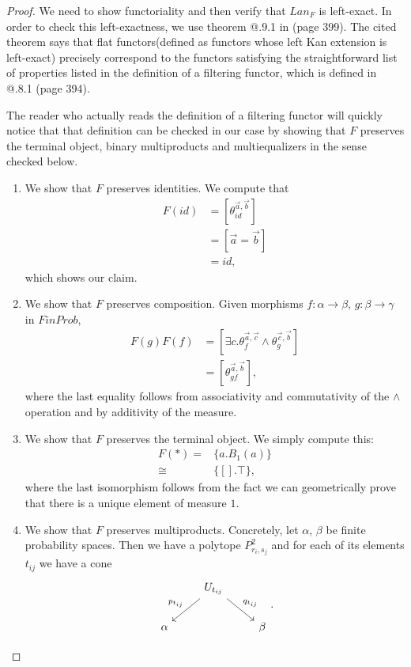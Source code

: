 \documentclass[a4paper]{amsproc}
\makeatletter
\theoremstyle{plain}
\theoremstyle{definition}
\theoremstyle{remark}
\numberwithin{equation}{section}
\newcommand{\Rmnum}[1]{\expandafter\@slowromancap\romannumeral #1@}
\makeatother
\begin{document}
\begin{proof}
    We need to show functoriality and then verify that $Lan_F$ is left-exact. In order to check this left-exactness, we use theorem \Rmnum{7}.9.1 in \cite{sheaves_geometry_logic}(page 399). The cited theorem says that flat functors(defined as functors whose left Kan extension is left-exact) precisely correspond to the functors satisfying the straightforward list of properties listed in the definition of a filtering functor, which is defined in \Rmnum{7}.8.1 (page 394).

    The reader who actually reads the definition of a filtering functor will quickly notice that that definition can be checked in our case by showing that $F$ preserves the terminal object, binary multiproducts and multiequalizers in the sense checked below.

    \begin{enumerate}
        \item We show that $F$ preserves identities. We compute that
            \begin{align*}
                F(id) &= [\theta^{\vec{a},\vec{b}}_{id}] \\
                &= [\vec{a}=\vec{b}] \\
                &= id,
            \end{align*}
            which shows our claim.
        \item We show that $F$ preserves composition. Given morphisms $f: \alpha \to \beta$, $g: \beta \to \gamma$ in $FinProb$,
            \begin{align*}
                F(g)F(f) &= [\exists c . \theta^{\vec{a},\vec{c}}_f \wedge \theta^{\vec{c},\vec{b}}_g] \\
                &= [\theta^{\vec{a},\vec{b}}_{gf}] ,
            \end{align*}
            where the last equality follows from associativity and commutativity of the $\wedge$ operation and by additivity of the measure.
        \item We show that $F$ preserves the terminal object. We simply compute this:
            \begin{align*}
                F(*) =& \{a. B_1(a)\} \\
                \cong& \{[].\top \} ,
            \end{align*}
            where the last isomorphism follows from the fact we can geometrically prove that there is a unique element of measure $1$.
        \item We show that $F$ preserves multiproducts. Concretely, let $\alpha$, $\beta$ be finite probability spaces. Then we have a polytope $P^2_{r_i,s_j}$ and for each of its elements $t_{ij}$ we have a cone
        \[\begin{tikzcd}
            & U_{t_{ij}} \arrow[ld, "p_{t_{ij}}"'] \arrow[rd, "q_{t_{ij}}"] &       \\
        \alpha &                                                               & \beta
        \end{tikzcd} .\]


\end{enumerate}
\end{proof}
\end{document}
